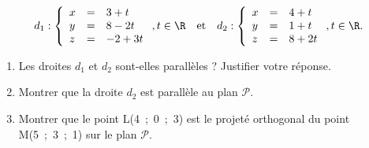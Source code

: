 \[d_1  : \left\{\begin{array}{l c l}
x	&=&3 + t\\
y 	&=& 8 - 2t\\
z	&=& - 2 + 3t\\
\end{array}\right. , t \in \R\quad \text{et}\quad 
d_2  : \left\{\begin{array}{l c l}
x	&=&4 + t\\
y 	&=&1 + t\\
z	&=&8 + 2t\\
\end{array}\right. , t \in \R.\]

\begin{enumerate}[resume]
\item Les droites $d_1$ et $d_2$ sont-elles parallèles ? Justifier votre réponse.
\item Montrer que la droite $d_2$ est parallèle au plan $\mathcal P$.
\item Montrer que le point L(4~;~0~;~3) est le projeté orthogonal du point M(5~;~3~;~1) sur le plan $\mathcal P$.
\end{enumerate}


\bigskip

